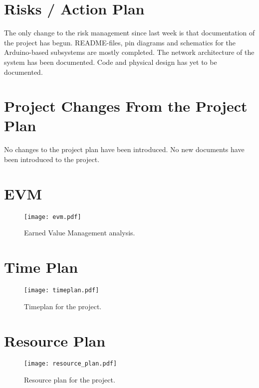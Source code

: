 \documentclass[11pt, titlepage]{article} %
\begin{document}
\section*{Risks / Action Plan}
The only change to the risk management since last week is that documentation of the project has begun.
README-files, pin diagrams and schematics for the Arduino-based subsystems are mostly completed.
The network architecture of the system has been documented. Code and physical design has yet to be
documented.

\section*{Project Changes From the Project Plan}
No changes to the project plan have been introduced. No new documents have been introduced to the project.

\appendix
\section{EVM}
\begin{figure}[h]
     \centering
     \texttt{[image: evm.pdf]}
     \caption{Earned Value Management analysis.}
     \label{fig:evm}
\end{figure}

\section{Time Plan}
\begin{sidewaysfigure}
     \centering
     \texttt{[image: timeplan.pdf]}
     \caption{Timeplan for the project.}
     \label{fig:resource}
\end{sidewaysfigure}

\section{Resource Plan}
\begin{sidewaysfigure}
     \centering
     \texttt{[image: resource\_plan.pdf]}
     \caption{Resource plan for the project.}
     \label{fig:resource}
 \end{sidewaysfigure}
\end{document}
